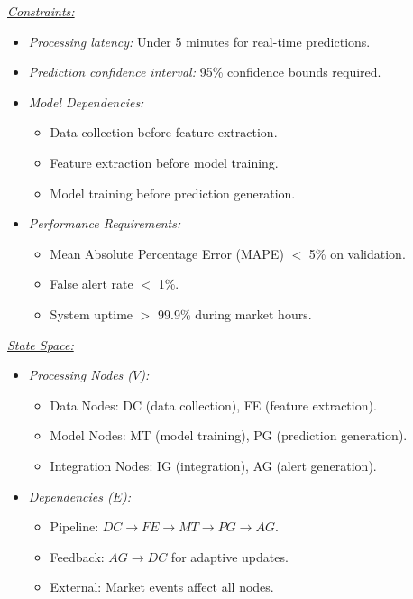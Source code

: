 \noindent \underline{\textit{Constraints:}}
\begin{itemize}[leftmargin=1.5em, topsep=-.15em, parsep=-.15em, label=*]
   \item \textit{Processing latency:} Under 5 minutes for real-time predictions.
   \item \textit{Prediction confidence interval:} 95\% confidence bounds required.
   \item \textit{Model Dependencies:} 
   \begin{itemize}[leftmargin=1em, topsep=-.1em, parsep=-.1em]
       \item Data collection before feature extraction.
       \item Feature extraction before model training.
       \item Model training before prediction generation.
   \end{itemize}
   \item \textit{Performance Requirements:}
   \begin{itemize}[leftmargin=1em, topsep=-.1em, parsep=-.1em]
       \item Mean Absolute Percentage Error (MAPE) $<$ 5\% on validation.
       \item False alert rate $<$ 1\%.
       \item System uptime $>$ 99.9\% during market hours.
   \end{itemize}
\end{itemize}

\noindent \underline{\textit{State Space:}}
\begin{itemize}[leftmargin=1.5em, topsep=-.1em, parsep=-.1em, label=*]
    \item \textit{Processing Nodes ($V$):}
    \begin{itemize}[leftmargin=1em, topsep=-.1em, parsep=-.1em]
        \item Data Nodes: DC (data collection), FE (feature extraction).
        \item Model Nodes: MT (model training), PG (prediction generation).
        \item Integration Nodes: IG (integration), AG (alert generation).
    \end{itemize}
    \item \textit{Dependencies ($E$):}
    \begin{itemize}[leftmargin=1em, topsep=-.1em, parsep=-.1em]
        \item Pipeline: $DC \rightarrow FE \rightarrow MT \rightarrow PG \rightarrow AG$.
        \item Feedback: $AG \rightarrow DC$ for adaptive updates.
        \item External: Market events affect all nodes.
    \end{itemize}
\end{itemize}

